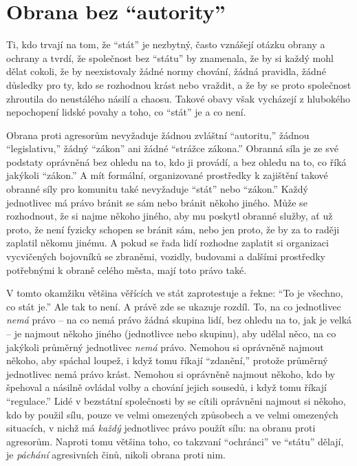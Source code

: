 \documentclass{book}
\begin{document}
\section{Obrana bez \enquote{autority}}

Ti, kdo trvají na tom, že \enquote{stát} je nezbytný, často vznášejí otázku obrany a ochrany a tvrdí, že společnost bez \enquote{státu} by znamenala, že by si každý mohl dělat cokoli, že by neexistovaly žádné normy chování, žádná pravidla, žádné důsledky pro ty, kdo se rozhodnou krást nebo vraždit, a že by se proto společnost zhroutila do neustálého násilí a chaosu. Takové obavy však vycházejí z hlubokého nepochopení lidské povahy a toho, co \enquote{stát} je a co není.

Obrana proti agresorům nevyžaduje žádnou zvláštní \enquote{autoritu,} žádnou \enquote{legislativu,} žádný \enquote{zákon} ani žádné \enquote{strážce zákona.} Obranná síla je ze své podstaty oprávněná bez ohledu na to, kdo ji provádí, a bez ohledu na to, co říká jakýkoli \enquote{zákon.} A mít formální, organizované prostředky k zajištění takové obranné síly pro komunitu také nevyžaduje \enquote{stát} nebo \enquote{zákon.} Každý jednotlivec má právo bránit se sám nebo bránit někoho jiného. Může se rozhodnout, že si najme někoho jiného, aby mu poskytl obranné služby, ať už proto, že není fyzicky schopen se bránit sám, nebo jen proto, že by za to raději zaplatil někomu jinému. A pokud se řada lidí rozhodne zaplatit si organizaci vycvičených bojovníků se zbraněmi, vozidly, budovami a dalšími prostředky potřebnými k obraně celého města, mají toto právo také.

V tomto okamžiku většina věřících ve stát zaprotestuje a řekne: \enquote{To je všechno, co stát je.} Ale tak to není. A právě zde se ukazuje rozdíl. To, na co jednotlivec \emph{nemá} právo -- na co nemá právo žádná skupina lidí, bez ohledu na to, jak je velká -- je najmout někoho jiného (jednotlivce nebo skupinu), aby udělal něco, na co jakýkoli průměrný jednotlivec \emph{nemá} právo. Nemohou si oprávněně najmout někoho, aby spáchal loupež, i když tomu říkají \enquote{zdanění,} protože průměrný jednotlivec nemá právo krást. Nemohou si oprávněně najmout někoho, kdo by špehoval a násilně ovládal volby a chování jejich sousedů, i když tomu říkají \enquote{regulace.} Lidé v bezstátní společnosti by se cítili oprávněni najmout si někoho, kdo by použil sílu, pouze ve velmi omezených způsobech a ve velmi omezených situacích, v nichž má \emph{každý} jednotlivec právo použít sílu: na obranu proti agresorům. Naproti tomu většina toho, co takzvaní \enquote{ochránci} ve \enquote{státu} dělají, je \emph{páchání} agresivních činů, nikoli obrana proti nim.
\end{document}
